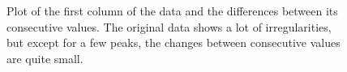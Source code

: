 \documentclass{article}
\begin{document}
\begin{figure}
    \centering
    \caption{Plot of the first column of the data and the differences between its consecutive values. The original data shows a lot of irregularities, but except for a few peaks, the changes between consecutive values are quite small.}
\end{figure}
\end{document}
